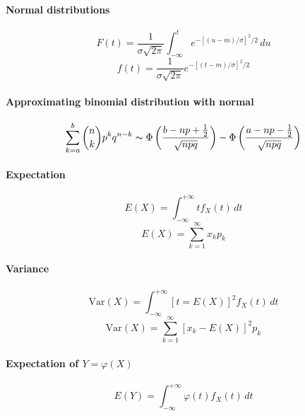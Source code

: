\documentclass[10pt]{article}
\begin{document}
\paragraph{Normal distributions}
\begin{equation*}F(t) = \frac{1}{\sigma\sqrt{2\pi}}\int_{-\infty}^t e^{-[(u-m)/\sigma]^2/2}\, du\end{equation*}
\begin{equation*}f(t) = \frac{1}{\sigma \sqrt{2\pi}} e^{-[(t-m)/\sigma]^2/2}\end{equation*}

\paragraph{Approximating binomial distribution with normal}
\begin{equation*}
\sum_{k=a}^b \binom{n}{k} p^k q^{n-k} \thicksim \Phi \left(\frac{b-np+\frac{1}{2}}{\sqrt{npq}}\right)
- \Phi \left( \frac{a-np-\frac{1}{2}}{\sqrt{npq}} \right)
\end{equation*}

\paragraph{Expectation}
\begin{equation*}
E(X) = \int_{-\infty}^{+\infty} t f_X(t)\, dt
\end{equation*}
\begin{equation*}
E(X) = \sum_{k=1}^\infty x_k p_k
\end{equation*}

\paragraph{Variance}
\begin{equation*}
\text{Var}(X) = \int_{-\infty}^{+\infty} [t = E(X)]^2 f_X(t)\, dt
\end{equation*}
\begin{equation*}
\text{Var}(X) = \sum_{k=1}^\infty [x_k - E(X)]^2 p_k
\end{equation*}

\paragraph{Expectation of $Y = \varphi(X)$}
\begin{equation*}
E(Y) = \int_{-\infty}^{+\infty} \varphi(t) f_X(t)\, dt
\end{equation*}
\end{document}
